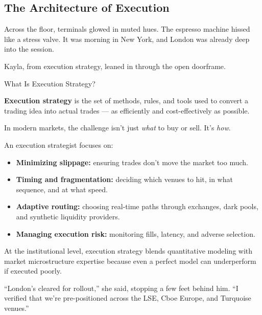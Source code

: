 
\subsection{The Architecture of Execution}

Across the floor, terminals glowed in muted hues.  The espresso machine hissed like a stress valve.  It was morning in 
New York, and London was already deep into the session.

Kayla, from execution strategy, leaned in through the open doorframe.

\medskip

\begin{TechnicalSidebar}{What Is Execution Strategy?}

  \textbf{Execution strategy} is the set of methods, rules, and tools used to convert a trading idea into actual trades — 
  as efficiently and cost-effectively as possible.
  
  \medskip
  
  In modern markets, the challenge isn’t just \textit{what} to buy or sell. It’s \textit{how}.
  
  \medskip
  
  An execution strategist focuses on:
  
  \begin{itemize}
    \item \textbf{Minimizing slippage:} ensuring trades don’t move the market too much.
    \item \textbf{Timing and fragmentation:} deciding which venues to hit, in what sequence, and at what speed.
    \item \textbf{Adaptive routing:} choosing real-time paths through exchanges, dark pools, and synthetic liquidity 
    providers.
    \item \textbf{Managing execution risk:} monitoring fills, latency, and adverse selection.
  \end{itemize}
  
  \medskip
  
  At the institutional level, execution strategy blends quantitative modeling with market microstructure expertise 
  because even a perfect model can underperform if executed poorly.
  
\end{TechnicalSidebar}

\medskip

“London’s cleared for rollout,” she said, stopping a few feet behind him. “I verified that we’re pre-positioned 
across the LSE, Cboe Europe, and Turquoise venues.”

